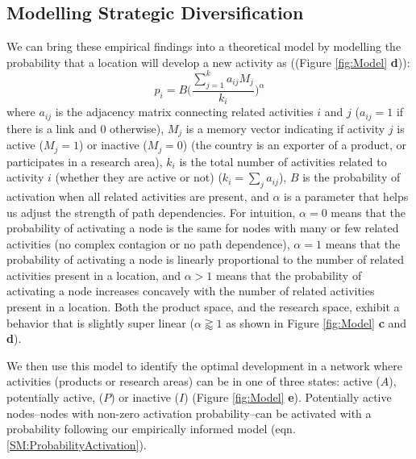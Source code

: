 \documentclass[preprint,superscriptaddress,floatfix]{article}
\begin{document}
\subsection*{Modelling Strategic Diversification}
We can bring these empirical findings into a theoretical model by modelling the probability that a location will develop a new activity as ((Figure \ref{fig:Model} \textbf{d})):
\begin{equation}
    p_i = B\Bigg(\frac{\sum_{j=1}^{k}a_{ij} M_j}{k_i}\Bigg)^\alpha
\label{SM:ProbabilityActivation}
\end{equation}
where $a_{ij}$ is the adjacency matrix connecting related activities $i$ and $j$  ($a_{ij}=1$ if there is a link and 0 otherwise), $M_j$ is a memory vector indicating if activity  $j$ is active ($M_j=1$) or inactive ($M_j=0$) (the country is an exporter of a product, or participates in a research area), $k_i$ is the total number of activities related to activity $i$ (whether they are active or not) ($k_i=\sum_{j}a_{ij}$), $B$ is the probability of activation when all related activities are present, and $\alpha$ is a parameter that helps us adjust the strength of path dependencies. For intuition,  $\alpha=0$ means that the probability of activating a node is the same for nodes with many or few related activities (no complex contagion or no path dependence), $\alpha=1$  means that the probability of activating a node is linearly proportional to the number of related activities present in a location, and $\alpha>1$ means that the probability of activating a node increases concavely with the number of related activities present in a location. Both the product space, and the research space, exhibit a behavior that is slightly super linear ($\alpha\gtrapprox 1$ as shown in Figure \ref{fig:Model} \textbf{c} and \textbf{d}). 

We then use this model to identify the optimal development in a network where activities (products or research areas) can be in one of three states: active ($A$), potentially active, ($P$) or inactive ($I$) (Figure \ref{fig:Model} \textbf{e}). Potentially active nodes--nodes with non-zero activation probability--can be activated with a probability following our empirically informed model (eqn. \ref{SM:ProbabilityActivation}). 
\end{document}
